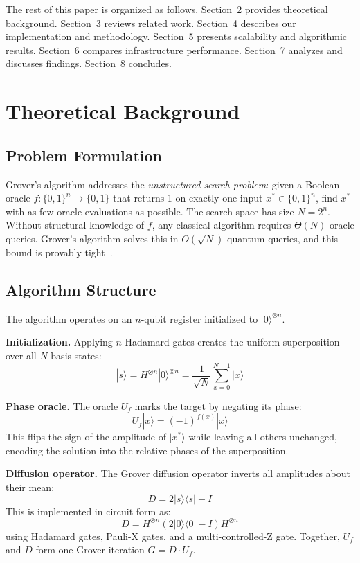 \documentclass[sigconf, authorversion, nonacm]{acmart}
\begin{document}
The rest of this paper is organized as follows. Section~2 provides theoretical background. Section~3 reviews related work. Section~4 describes our implementation and methodology. Section~5 presents scalability and algorithmic results. Section~6 compares infrastructure performance. Section~7 analyzes and discusses findings. Section~8 concludes.

\section{Theoretical Background}

\subsection{Problem Formulation}

Grover's algorithm addresses the \emph{unstructured search problem}: given a Boolean oracle $f : \{0,1\}^n \to \{0,1\}$ that returns 1 on exactly one input $x^* \in \{0,1\}^n$, find $x^*$ with as few oracle evaluations as possible. The search space has size $N = 2^n$. Without structural knowledge of $f$, any classical algorithm requires $\Theta(N)$ oracle queries. Grover's algorithm solves this in $O(\sqrt{N})$ quantum queries, and this bound is provably tight~\cite{Bennett1997}.

\subsection{Algorithm Structure}

The algorithm operates on an $n$-qubit register initialized to $|0\rangle^{\otimes n}$.

\textbf{Initialization.} Applying $n$ Hadamard gates creates the uniform superposition over all $N$ basis states:
\[
|s\rangle = H^{\otimes n}|0\rangle^{\otimes n} = \frac{1}{\sqrt{N}} \sum_{x=0}^{N-1} |x\rangle
\]

\textbf{Phase oracle.} The oracle $U_f$ marks the target by negating its phase:
\[
U_f|x\rangle = (-1)^{f(x)}|x\rangle
\]
This flips the sign of the amplitude of $|x^*\rangle$ while leaving all others unchanged, encoding the solution into the relative phases of the superposition.

\textbf{Diffusion operator.} The Grover diffusion operator inverts all amplitudes about their mean:
\[
D = 2|s\rangle\langle s| - I
\]
This is implemented in circuit form as:
\[
D = H^{\otimes n}(2|0\rangle\langle 0| - I)H^{\otimes n}
\]
using Hadamard gates, Pauli-X gates, and a multi-controlled-Z gate. Together, $U_f$ and $D$ form one Grover iteration $G = D \cdot U_f$.
\end{document}
